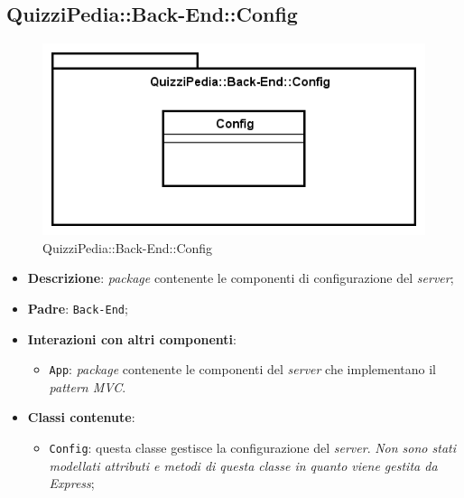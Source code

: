 \newpage
\subsection{QuizziPedia::Back-End::Config}

\label{QuizziPedia::Back-End::Config}
\begin{figure}[ht]
	\centering
	\includegraphics[scale=0.7]{UML/Package/QuizziPedia_Back-End_Config.png}
	\caption{QuizziPedia::Back-End::Config}
\end{figure}
\FloatBarrier

	\begin{itemize}
		\item \textbf{Descrizione}:
		\textit{package} contenente le componenti di configurazione del \textit{server};
		\item \textbf{Padre}: \texttt{Back-End};
		\item \textbf{Interazioni con altri componenti}:
			\begin{itemize}
				\item \texttt{App}:
				\textit{package} contenente le componenti del \textit{server} che implementano il \textit{pattern MVC}.
			\end{itemize}
		\item \textbf{Classi contenute}:
		\begin{itemize}
			\item \texttt{Config}: questa classe gestisce la configurazione del \textit{server}. \textit{Non sono stati modellati attributi e metodi di questa classe in quanto viene gestita da Express};
		\end{itemize}
	\end{itemize}

